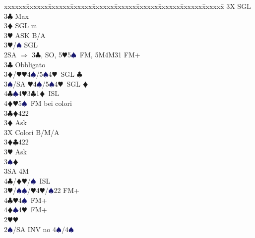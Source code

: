 \documentclass[a4paper,italian]{article}
\newcommand{\BC}{\textcolor{OliveGreen}{$\clubsuit$}}
\newcommand{\BD}{\textcolor{RedOrange}{$\vardiamondsuit$}}
\newcommand{\BH}{\textcolor{Red2}{$\varheartsuit${}}}
\newcommand{\BS}{\textcolor{MidnightBlue}{$\spadesuit${}}}
\newenvironment{bidtable}
{\begin{tabbing}

    xxxxxx\=xxxxxx\=xxxxxx\=xxxxxx\=xxxxxx\=xxxxxx\=xxxxxx\=xxxxxx\=xxxxxx\=xxxxxx\=\kill}
{\end{tabbing} }%
\begin{document}
\begin{multicols}{2}
\begin{bidtable}
                                            3X \> SGL\-\\
                                            3\BC \> Max\+\\
                                            3\BD \> SGL m\+\\
                                            3\BH \> ASK B/A\-\\
                                            3\BH/\BS \> SGL\-\-\\
                                            2SA \> $\Rightarrow$ 3\BC , SO, 5\BH 5\BS\ FM, 5M4M31 FM+\+\\
                                            3\BC \> Obbligato\+\\
                                            3\BD/\BH {}\BH4\BS/5\BS4\BH\ SGL \BC \\
                                            3\BS/SA \BH4\BS/5\BS4\BH\ SGL \BD \\
                                            4\BC {}\BS 4\BH 3\BC 1\BD\ ISL\\
                                            4\BD {}\BH 5\BS\ FM bei colori\-\-\\
                                            3\BC {}\BD 422\+\\
                                            3\BD \> Ask\+\\
                                            3X \> Colori B/M/A\-\-\\
                                            3\BD {}\BC 422\+\\
                                            3\BH \> Ask\+\\
                                            3\BS {}\BD \\
                                            3SA \> 4M\\
                                            4\BC/\BD {}\BH /\BS\ ISL\-\-\\
                                            3\BH/\BS {}\BS /\BH 4\BH /\BS 22 FM+\\
                                            4\BC {}\BH 4\BS\ FM+\\
                                            4\BD {}\BS 4\BH\ FM+\-\\
                                            2\BH {}\BH \+\\
                                            2\BS/SA \> INV no 4\BS/4\BS \\

\end{bidtable}
\end{multicols}
\end{document}
